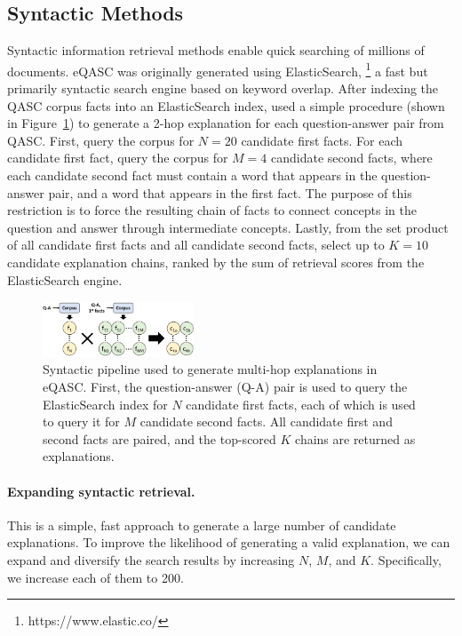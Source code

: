 \documentclass[letterpaper]{article} %
\begin{document}
\subsection{Syntactic Methods}\label{sec:syntactic}
Syntactic information retrieval methods enable quick searching of millions of documents.
eQASC was originally generated using ElasticSearch, \footnote{https://www.elastic.co/} a fast but primarily syntactic search engine based on keyword overlap. After indexing the QASC corpus facts into an ElasticSearch index, \citet{jhamtani-clark-2020-learning} used a simple procedure (shown in Figure~\ref{fig:syntactic_pipeline}) to generate a 2-hop explanation for each question-answer pair from QASC. First, query the corpus for $N=20$ candidate first facts. For each candidate first fact, query the corpus for $M=4$ candidate second facts, where each candidate second fact must contain a word that appears in the question-answer pair, and a word that appears in the first fact. The purpose of this restriction is to force the resulting chain of facts to connect concepts in the question and answer through intermediate concepts. Lastly, from the set product of all candidate first facts and all candidate second facts, select up to $K=10$ candidate explanation chains, ranked by the sum of retrieval scores from the ElasticSearch engine.

\begin{figure}
    \centering
    \includegraphics[width=0.4\textwidth]{syntactic_pipeline.pdf}
    \vspace{-5pt}
    \caption{Syntactic pipeline used to generate multi-hop explanations in eQASC. First, the question-answer (Q-A) pair is used to query the ElasticSearch index for $N$ candidate first facts, each of which is used to query it for $M$ candidate second facts. All candidate first and second facts are paired, and the top-scored $K$ chains are returned as explanations. }
    \vspace{-1em}
    \label{fig:syntactic_pipeline}
\end{figure}

\paragraph{Expanding syntactic retrieval.}
This is a simple, fast approach to generate a large number of candidate explanations. To improve the likelihood of generating a valid explanation, we can expand and diversify the search results by increasing $N$, $M$, and $K$. Specifically, we increase each of them to 200.
\end{document}
